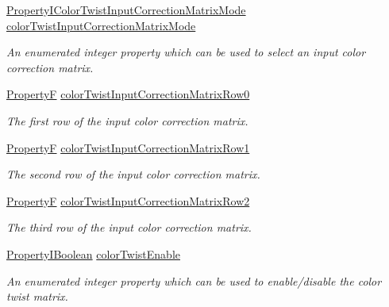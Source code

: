 \begin{DoxyCompactItemize}
\hyperlink{group___common_interface_gad8aa01209e3623c8739f5e1ded1b187d}{Property\+I\+Color\+Twist\+Input\+Correction\+Matrix\+Mode} \hyperlink{classmv_i_m_p_a_c_t_1_1acquire_1_1_image_processing_a7af8df48fdaec0dd1a1dd6edff1a13cd}{color\+Twist\+Input\+Correction\+Matrix\+Mode}
\begin{DoxyCompactList}\small\item\em An enumerated integer property which can be used to select an input color correction matrix. \end{DoxyCompactList}\item 
\hyperlink{group___common_interface_gaf54865fe5a3d5cfd15f9a111b40d09f9}{Property\+F} \hyperlink{classmv_i_m_p_a_c_t_1_1acquire_1_1_image_processing_a697c4174ae80d29018b6595882ee8fed}{color\+Twist\+Input\+Correction\+Matrix\+Row0}
\begin{DoxyCompactList}\small\item\em The first row of the input color correction matrix. \end{DoxyCompactList}\item 
\hyperlink{group___common_interface_gaf54865fe5a3d5cfd15f9a111b40d09f9}{Property\+F} \hyperlink{classmv_i_m_p_a_c_t_1_1acquire_1_1_image_processing_a95c6b003d27034b536a15106c79f2c16}{color\+Twist\+Input\+Correction\+Matrix\+Row1}
\begin{DoxyCompactList}\small\item\em The second row of the input color correction matrix. \end{DoxyCompactList}\item 
\hyperlink{group___common_interface_gaf54865fe5a3d5cfd15f9a111b40d09f9}{Property\+F} \hyperlink{classmv_i_m_p_a_c_t_1_1acquire_1_1_image_processing_afb2992733955b923314845678c335e77}{color\+Twist\+Input\+Correction\+Matrix\+Row2}
\begin{DoxyCompactList}\small\item\em The third row of the input color correction matrix. \end{DoxyCompactList}\item 
\hyperlink{group___common_interface_ga44f9437e24b21b6c93da9039ec6786aa}{Property\+I\+Boolean} \hyperlink{classmv_i_m_p_a_c_t_1_1acquire_1_1_image_processing_a070473c70f0ee8047c89db923747b8f2}{color\+Twist\+Enable}
\begin{DoxyCompactList}\small\item\em An enumerated integer property which can be used to enable/disable the color twist matrix. \end{DoxyCompactList}\item 

\end{DoxyCompactItemize}

